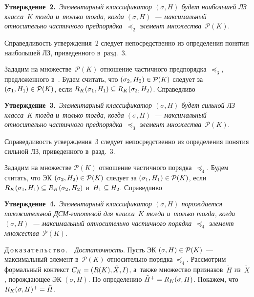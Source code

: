 \begin{multicols}{2}
  \smallskip
  
  \noindent
  \textbf{Утверждение~2.}\ \textit{Элементарный 
классификатор $(\sigma, H)$ будет наибольшей ЛЗ 
класса~$K$ тогда и~только тогда, когда $(\sigma, H)$~--- максимальный 
относительно час\-тич\-но\-го предпорядка~$\preceq_2$ элемент 
множества~$\mathcal{P}(K)$}.
  
  \smallskip
  
  Справедливость утверж\-де\-ния~2 следует непосредственно из определения 
понятия наибольшей ЛЗ, приведенного в~разд.~3.
  
  Зададим на множестве~$\mathcal{P}(K)$ отношение час\-тич\-но\-го 
предпорядка~$\preceq_3$, предложенного в~\cite{21-duk}. Будем считать, что 
$(\sigma_2, H_2)\hm\in \mathcal{P}(K)$ следует за $(\sigma_1, H_1) \hm\in 
\mathcal{P}(K)$, если $R_K(\sigma_1, H_1)\hm\subseteq R_K(\sigma_2, H_2)$. 
Спра\-вед\-ливо
  
  \smallskip
  
  \noindent
  \textbf{Утверждение~3.}\ \textit{Элементарный 
классификатор $(\sigma, H)$ будет сильной ЛЗ 
класса~$K$ тогда и~только тогда, когда $(\sigma, H)$~--- максимальный 
относительно час\-тич\-но\-го предпорядка~$\preceq_3$ элемент множества~$\mathcal{P}(K)$}.
  
  \smallskip
  
  Справедливость утверж\-де\-ния~3 следует непосредственно из определения 
понятия сильной ЛЗ, приведенного в~разд.~3.
  
  Зададим на множестве $\mathcal{P}(K)$ отношение час\-тич\-но\-го по\-ряд\-ка~$\preceq_4$. 
  Будем считать, что ЭК $(\sigma_2, H_2)\hm\in \mathcal{P}(K)$ 
следует за $(\sigma_1, H_1) \hm\in \mathcal{P}(K)$, если $R_K(\sigma_1, H_1) 
\hm\subseteq R_K(\sigma_2, H_2)$ и~$H_1\hm\subseteq H_2$. Спра\-вед\-ливо
  
  \smallskip
  
  \noindent
  \textbf{Утверждение~4.}\ \textit{Элементарный 
классификатор $(\sigma, H)$ по\-рож\-да\-ет\-ся 
положительной ДСМ-ги\-по\-те\-зой для класса~$K$ тогда и~только тогда, 
когда $(\sigma, H)$~--- максимальный относительно час\-тич\-но\-го по\-ряд\-ка~$\preceq_4$ 
элемент множества~$\mathcal{P}(K)$}. 
  
  \smallskip
  
  \noindent
  Д\,о\,к\,а\,з\,а\,т\,е\,л\,ь\,с\,т\,в\,о\,.\ \ \textit{Достаточность}. Пусть ЭК 
$(\sigma, H)\hm\in \mathcal{P}(K)$~--- максимальный элемент 
в~$\mathcal{P}(K)$ относительно порядка $\preceq_4$. Рас\-смот\-рим 
формальный кон\-текст $C_K\hm= (R(K), \tilde{X}, I)$, а~так\-же множество 
при\-зна\-ков~$\tilde{H}$ из~$\tilde{X}$, по\-рож\-да\-ющее ЭК $(\sigma, H)$. По 
определению $\tilde{H}^+\hm= R_K(\sigma, H)$. Покажем, что $R_K(\sigma, 
H)^+\hm= \tilde{H}$.
  

\end{multicols}
